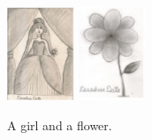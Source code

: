\documentclass[a4paper]{article}
\begin{document}
\begin{figure}[!hbt]
    \centering
    \includegraphics[width=2.0cm]{girl}\hfill
    \includegraphics[width=2.0cm]{flower}
    \caption{A girl and a flower.}
    \label{girl_flower}
    \end{figure}
\end{document}
